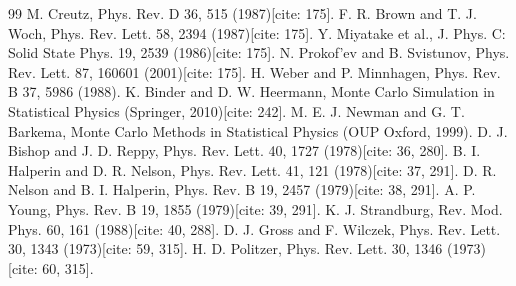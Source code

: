 \documentclass[11pt]{article}
\begin{document}
\begin{thebibliography}{99}
 M. Creutz, Phys. Rev. D 36, 515 (1987)[cite: 175].
 F. R. Brown and T. J. Woch, Phys. Rev. Lett. 58, 2394 (1987)[cite: 175].
 Y. Miyatake et al., J. Phys. C: Solid State Phys. 19, 2539 (1986)[cite: 175].
 N. Prokof’ev and B. Svistunov, Phys. Rev. Lett. 87, 160601 (2001)[cite: 175].
 H. Weber and P. Minnhagen, Phys. Rev. B 37, 5986 (1988). %
 K. Binder and D. W. Heermann, Monte Carlo Simulation in Statistical Physics (Springer, 2010)[cite: 242]. %
 M. E. J. Newman and G. T. Barkema, Monte Carlo Methods in Statistical Physics (OUP Oxford, 1999). %
 D. J. Bishop and J. D. Reppy, Phys. Rev. Lett. 40, 1727 (1978)[cite: 36, 280].
 B. I. Halperin and D. R. Nelson, Phys. Rev. Lett. 41, 121 (1978)[cite: 37, 291].
 D. R. Nelson and B. I. Halperin, Phys. Rev. B 19, 2457 (1979)[cite: 38, 291].
 A. P. Young, Phys. Rev. B 19, 1855 (1979)[cite: 39, 291].
 K. J. Strandburg, Rev. Mod. Phys. 60, 161 (1988)[cite: 40, 288].
 D. J. Gross and F. Wilczek, Phys. Rev. Lett. 30, 1343 (1973)[cite: 59, 315].
 H. D. Politzer, Phys. Rev. Lett. 30, 1346 (1973)[cite: 60, 315].
\end{thebibliography}
\end{document}

